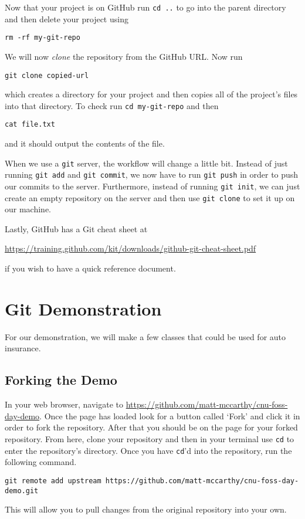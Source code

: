 \documentclass[notitlepage]{simple}
\begin{document}
Now that your project is on GitHub run \verb|cd ..| to go into the parent directory and then delete your project using
\begin{terminal}
	\verb|rm -rf my-git-repo|
\end{terminal}
We will now \textit{clone} the repository from the GitHub URL.
Now run
\begin{terminal}
	\verb|git clone copied-url|
\end{terminal}
which creates a directory for your project and then copies all of the project's files into that directory.
To check run \verb|cd my-git-repo| and then
\begin{terminal}
	\verb|cat file.txt|
\end{terminal}
and it should output the contents of the file.

When we use a \verb|git| server, the workflow will change a little bit.
Instead of just running \verb|git add| and \verb|git commit|, we now have to run \verb|git push| in order to push our commits to the server.
Furthermore, instead of running \verb|git init|, we can just create an empty repository on the server and then use \verb|git clone| to set it up on our machine.

Lastly, GitHub has a Git cheat sheet at
\begin{center}
\url{https://training.github.com/kit/downloads/github-git-cheat-sheet.pdf}
\end{center}
if you wish to have a quick reference document.


\section{Git Demonstration}

For our demonstration, we will make a few classes that could be used for auto insurance.

\subsection{Forking the Demo}

In your web browser, navigate to \url{https://github.com/matt-mccarthy/cnu-foss-day-demo}.
Once the page has loaded look for a button called `Fork' and click it in order to fork the repository.
After that you should be on the page for your forked repository.
From here, clone your repository and then in your terminal use \verb|cd| to enter the repository's directory.
Once you have \verb|cd|'d into the repository, run the following command.
\begin{terminal}
\verb|git remote add upstream https://github.com/matt-mccarthy/cnu-foss-day-demo.git|
\end{terminal}
This will allow you to pull changes from the original repository into your own.
\end{document}
